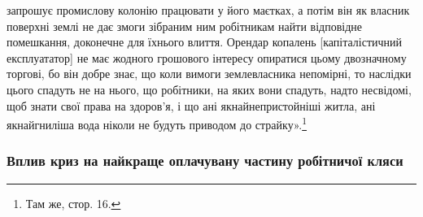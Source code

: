 \parcont{}  %
запрошує промислову колонію працювати у його маєтках, а
потім він як власник поверхні землі не дає змоги зібраним ним
робітникам найти відповідне помешкання, доконечне для їхнього
влиття. Орендар копалень [капіталістичний експлуататор] не
має жодного грошового інтересу опиратися цьому двозначному
торгові, бо він добре знає, що коли вимоги землевласника непомірні,
то наслідки цього спадуть не на нього, що робітники, на
яких вони спадуть, надто несвідомі, щоб знати свої права на здоров’я,
і що ані якнайнепристойніші житла, ані якнайгниліша
вода ніколи не будуть приводом до страйку».\footnote{
Там же, стор. 16.
}

\subsubsection{Вплив криз на найкраще оплачувану
частину робітничої кляси}

